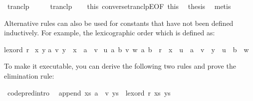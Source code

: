\begin{isabellebody}
\ tranclp\isanewline
{}\isamarkupfalse%
\ {\isacharminus}\isanewline
\ \ \isamarkupfalse%
\ tranclp\isanewline
\ \ \isamarkupfalse%
\ this\ converse{\isacharunderscore}tranclpE{\isacharbrackleft}OF\ this{\isacharparenleft}{}{\isacharparenright}{\isacharbrackright}\ \isamarkupfalse%
\ thesis\ \isamarkupfalse%
\ metis\isanewline
{}\isamarkupfalse%
%
\endisatagquote
{\isafoldquote}%
%
\isadelimquote
%
\endisadelimquote
%
\begin{isamarkuptext}%
\noindent Alternative rules can also be used for constants that have not
been defined inductively. For example, the lexicographic order which
is defined as:%
\end{isamarkuptext}%
\isamarkuptrue%
%
\isadelimquote
%
\endisadelimquote
%
\isatagquote
%
\begin{isamarkuptext}%
\begin{isabelle}%
lexord\ r\ {\isasymequiv}\isanewline
{\isacharbraceleft}{\isacharparenleft}x{\isacharcomma}\ y{\isacharparenright}{\isachardot}\isanewline
\isaindent{\ }{\isasymexists}a\ v{\isachardot}\ y\ {\isacharequal}\ x\ {\isacharat}\ a\ {\isacharhash}\ v\ {\isasymor}\isanewline
{}u\ a\ b\ v\ w{\isachardot}\ {\isacharparenleft}a{\isacharcomma}\ b{\isacharparenright}\ {\isasymin}\ r\ {\isasymand}\ x\ {\isacharequal}\ u\ {\isacharat}\ a\ {\isacharhash}\ v\ {\isasymand}\ y\ {\isacharequal}\ u\ {\isacharat}\ b\ {\isacharhash}\ w{\isacharparenright}{\isacharbraceright}%
\end{isabelle}%
\end{isamarkuptext}%
\isamarkuptrue%
%
\endisatagquote
{\isafoldquote}%
%
\isadelimquote
%
\endisadelimquote
%
\begin{isamarkuptext}%
\noindent To make it executable, you can derive the following two rules and prove the
elimination rule:%
\end{isamarkuptext}%
\isamarkuptrue%
%
\isadelimproof
%
\endisadelimproof
%
\isatagproof
%
\endisatagproof
{\isafoldproof}%
%
\isadelimproof
%
\endisadelimproof
%
\isadelimquote
%
\endisadelimquote
%
\isatagquote
{}\isamarkupfalse%
\ {\isacharbrackleft}code{\isacharunderscore}pred{\isacharunderscore}intro{\isacharbrackright}{\isacharcolon}\isanewline
\ \ {\isachardoublequoteopen}append\ xs\ {\isacharparenleft}a\ {\isacharhash}\ v{\isacharparenright}\ ys\ {\isasymLongrightarrow}\ lexord\ r\ {\isacharparenleft}xs{\isacharcomma}\ ys{\isacharparenright}{\isachardoublequoteclose}\isanewline

\end{isabellebody}
